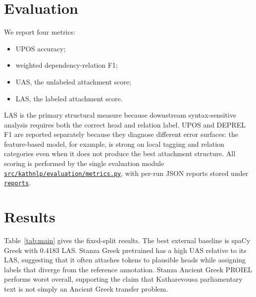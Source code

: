 \documentclass[11pt]{article}
\newcommand{\repobase}{https://github.com/gmikros/katharevousa-nlp-tooling}
\newcommand{\repofile}[1]{\href{\repobase/blob/main/#1}{\nolinkurl{#1}}}
\newcommand{\repodir}[1]{\href{\repobase/tree/main/#1}{\nolinkurl{#1}}}
\begin{document}
\section{Evaluation}

We report four metrics:

\begin{itemize}[leftmargin=1.5em]
  \item UPOS accuracy;
  \item weighted dependency-relation F1;
  \item UAS, the unlabeled attachment score;
  \item LAS, the labeled attachment score.
\end{itemize}

LAS is the primary structural measure because downstream syntax-sensitive analysis requires both the correct head and relation label. UPOS and DEPREL F1 are reported separately because they diagnose different error surfaces: the feature-based model, for example, is strong on local tagging and relation categories even when it does not produce the best attachment structure. All scoring is performed by the single evaluation module \repofile{src/kathnlp/evaluation/metrics.py}, with per-run JSON reports stored under \repodir{reports}.

\section{Results}

Table~\ref{tab:main} gives the fixed-split results. The best external baseline is spaCy Greek with 0.4183 LAS. Stanza Greek pretrained has a high UAS relative to its LAS, suggesting that it often attaches tokens to plausible heads while assigning labels that diverge from the reference annotation. Stanza Ancient Greek PROIEL performs worst overall, supporting the claim that Katharevousa parliamentary text is not simply an Ancient Greek transfer problem.
\end{document}
